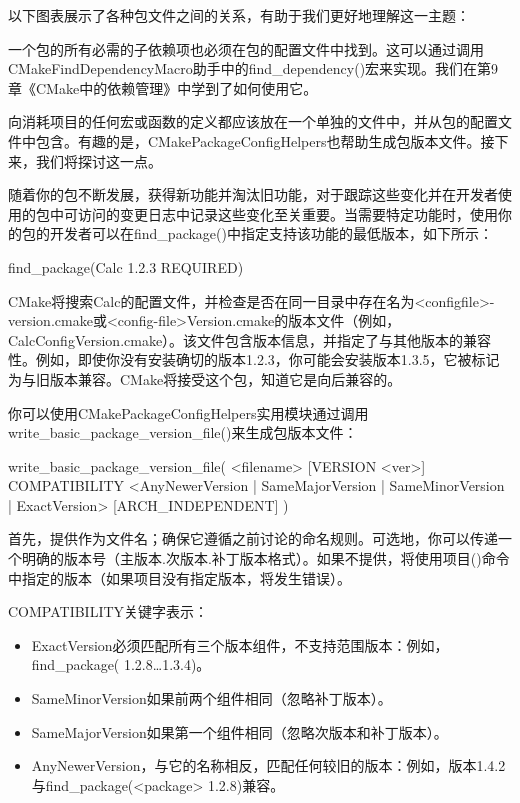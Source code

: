 以下图表展示了各种包文件之间的关系，有助于我们更好地理解这一主题：


一个包的所有必需的子依赖项也必须在包的配置文件中找到。这可以通过调用CMakeFindDependencyMacro助手中的find\_dependency()宏来实现。我们在第9章《CMake中的依赖管理》中学到了如何使用它。

向消耗项目的任何宏或函数的定义都应该放在一个单独的文件中，并从包的配置文件中包含。有趣的是，CMakePackageConfigHelpers也帮助生成包版本文件。接下来，我们将探讨这一点。


随着你的包不断发展，获得新功能并淘汰旧功能，对于跟踪这些变化并在开发者使用的包中可访问的变更日志中记录这些变化至关重要。当需要特定功能时，使用你的包的开发者可以在find\_package()中指定支持该功能的最低版本，如下所示：

\begin{cmake}
find_package(Calc 1.2.3 REQUIRED)
\end{cmake}

CMake将搜索Calc的配置文件，并检查是否在同一目录中存在名为<configfile>-version.cmake或<config-file>Version.cmake的版本文件（例如，CalcConfigVersion.cmake）。该文件包含版本信息，并指定了与其他版本的兼容性。例如，即使你没有安装确切的版本1.2.3，你可能会安装版本1.3.5，它被标记为与旧版本兼容。CMake将接受这个包，知道它是向后兼容的。

你可以使用CMakePackageConfigHelpers实用模块通过调用write\_basic\_package\_version\_file()来生成包版本文件：

\begin{shell}
write_basic_package_version_file(
    <filename> [VERSION <ver>]
    COMPATIBILITY <AnyNewerVersion | SameMajorVersion |
    SameMinorVersion | ExactVersion>
    [ARCH_INDEPENDENT]
)
\end{shell}

首先，提供作为文件名；确保它遵循之前讨论的命名规则。可选地，你可以传递一个明确的版本号（主版本.次版本.补丁版本格式）。如果不提供，将使用项目()命令中指定的版本（如果项目没有指定版本，将发生错误）。

COMPATIBILITY关键字表示：

\begin{itemize}
\item
ExactVersion必须匹配所有三个版本组件，不支持范围版本：例如，find\_package( 1.2.8…1.3.4)。

\item
SameMinorVersion如果前两个组件相同（忽略补丁版本）。

\item
SameMajorVersion如果第一个组件相同（忽略次版本和补丁版本）。

\item
AnyNewerVersion，与它的名称相反，匹配任何较旧的版本：例如，版本1.4.2与find\_package(<package> 1.2.8)兼容。
\end{itemize}

